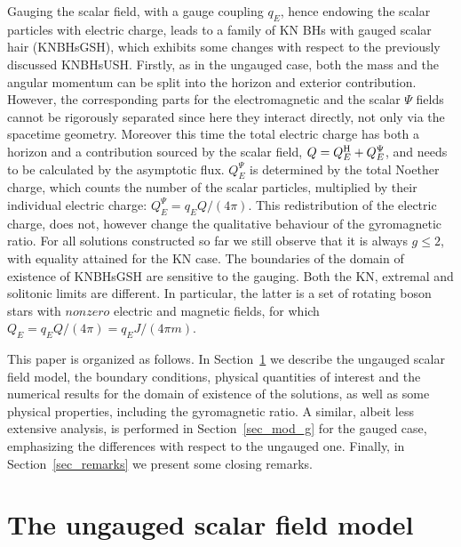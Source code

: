 \documentclass{article}
\begin{document}
Gauging the scalar field, with a gauge coupling $q_E$, hence endowing the scalar particles with electric charge, leads to a family of KN BHs with gauged scalar hair (KNBHsGSH), which exhibits some changes with respect to the previously discussed KNBHsUSH. 
%
Firstly, as in the ungauged case,
both the mass and the angular momentum can be split  into the horizon and exterior contribution.
However, the corresponding parts for the electromagnetic and  the scalar $\Psi$ fields cannot be rigorously
separated since  here they interact directly, not only via the spacetime geometry.
Moreover this time  
the total electric charge has both a horizon and a contribution sourced by the scalar field,  $Q=Q^{\rm H}_E+Q^\Psi_E$,  
and needs to be calculated by the asymptotic flux.
$Q_E^\Psi$ is determined by the total Noether charge, which counts the number of the scalar particles, multiplied by their individual electric charge:  $Q_E^\Psi=q_E Q/(4 \pi)$. 
This redistribution of the electric charge, does not, however change the qualitative behaviour of the gyromagnetic ratio. 
For all solutions constructed so far we still observe that it is always $g\leqslant 2$, with equality attained for the KN case. 
The boundaries of the domain of existence of KNBHsGSH are sensitive to the gauging. 
Both the KN, extremal and solitonic limits are different. 
In particular, the latter is a set of rotating  boson stars with  $nonzero$ electric 
and magnetic fields, for which  $Q_E= q_E Q/(4\pi)= q_E J/(4 \pi m)$.  

 
\bigskip

This paper is organized as follows. In Section~\ref{sec_mod_u} we describe the ungauged scalar field model, the boundary conditions, physical quantities of interest and the numerical results for the domain of existence of the solutions, as well as some physical properties, including the gyromagnetic ratio. A similar, albeit less extensive analysis, is performed in Section~\ref{sec_mod_g} for the gauged case, emphasizing the differences with respect to the ungauged one. Finally, in Section~\ref{sec_remarks} we present some closing remarks.



\section{The ungauged scalar field model}
\label{sec_mod_u}


\end{document}

